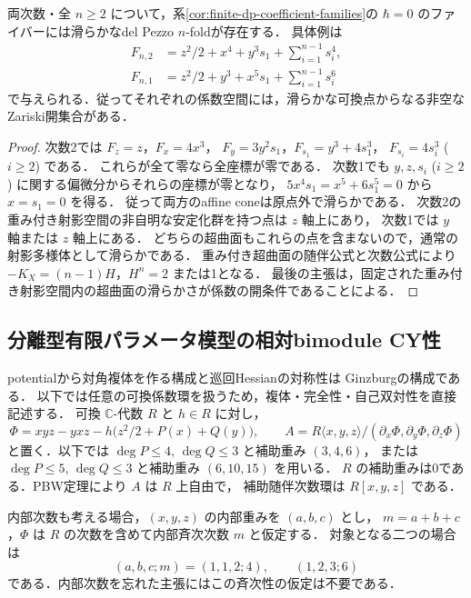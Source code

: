 \begin{proposition}[滑らかな可換点の非空性]
\label{prop:finite-family-smooth-points}
両次数・全 $n\ge2$ について，系\ref{cor:finite-dp-coefficient-families}の
$\hbar=0$ のファイバーには滑らかなdel Pezzo $n$-foldが存在する．
具体例は
\begin{align*}
 F_{n,2}&=z^2/2+x^4+y^3s_1+\sum_{i=1}^{n-1}s_i^4,\\
 F_{n,1}&=z^2/2+y^3+x^5s_1+\sum_{i=1}^{n-1}s_i^6
\end{align*}
で与えられる．従ってそれぞれの係数空間には，滑らかな可換点からなる非空なZariski開集合がある．
\end{proposition}

\begin{proof}
次数2では $F_z=z$，$F_x=4x^3$，
$F_y=3y^2s_1$，$F_{s_1}=y^3+4s_1^3$，
$F_{s_i}=4s_i^3$ ($i\ge2$) である．
これらが全て零なら全座標が零である．
次数1でも $y,z,s_i$ ($i\ge2$) に関する偏微分からそれらの座標が零となり，
$5x^4s_1=x^5+6s_1^5=0$ から $x=s_1=0$ を得る．
従って両方のaffine coneは原点外で滑らかである．
次数2の重み付き射影空間の非自明な安定化群を持つ点は $z$ 軸上にあり，
次数1では $y$ 軸または $z$ 軸上にある．
どちらの超曲面もこれらの点を含まないので，通常の射影多様体として滑らかである．
重み付き超曲面の随伴公式と次数公式により
$-K_X=(n-1)H$，$H^n=2$ または1となる．
最後の主張は，固定された重み付き射影空間内の超曲面の滑らかさが係数の開条件であることによる．
\end{proof}

\subsection{分離型有限パラメータ模型の相対bimodule CY性}
potentialから対角複体を作る構成と巡回Hessianの対称性は
Ginzburgの構成である\cite[Proposition 5.1.9, Theorem 5.3.1,
Proposition 8.1.3(ii)]{Ginzburg2007}．
以下では任意の可換係数環を扱うため，複体・完全性・自己双対性を直接記述する．
可換 $\mathbb C$-代数 $R$ と $h\in R$ に対し，
\[
 \Phi=xyz-yxz-h\bigl(z^2/2+P(x)+Q(y)\bigr),\qquad
 A=R\langle x,y,z\rangle/(\partial_x\Phi,\partial_y\Phi,\partial_z\Phi)
\]
と置く．以下では $\deg P\le4$, $\deg Q\le3$ と補助重み $(3,4,6)$，
または $\deg P\le5$, $\deg Q\le3$ と補助重み $(6,10,15)$ を用いる．
$R$ の補助重みは0である．PBW定理により $A$ は $R$ 上自由で，
補助随伴次数環は $R[x,y,z]$ である．

内部次数も考える場合，$(x,y,z)$ の内部重みを $(a,b,c)$ とし，
$m=a+b+c$，$\Phi$ は $R$ の次数を含めて内部斉次次数 $m$ と仮定する．
対象となる二つの場合は
\[
 (a,b,c;m)=(1,1,2;4),\qquad (1,2,3;6)
\]
である．内部次数を忘れた主張にはこの斉次性の仮定は不要である．

